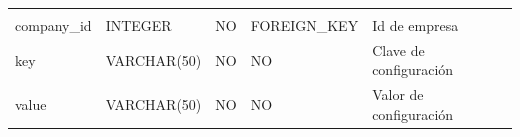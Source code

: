 \documentclass[12pt,a4paperpaper,]{report}
\begin{document}
\begin{longtable}[]{@{}lllll@{}}
\begin{minipage}[t]{0.11\columnwidth}
\end{minipage}\tabularnewline
\begin{minipage}[t]{0.21\columnwidth}\raggedright\strut
company\_id\strut
\end{minipage} & \begin{minipage}[t]{0.19\columnwidth}\raggedright\strut
INTEGER\strut
\end{minipage} & \begin{minipage}[t]{0.16\columnwidth}\raggedright\strut
NO\strut
\end{minipage} & \begin{minipage}[t]{0.19\columnwidth}\raggedright\strut
FOREIGN\_KEY\strut
\end{minipage} & \begin{minipage}[t]{0.11\columnwidth}\raggedright\strut
Id de empresa\strut
\end{minipage}\tabularnewline
\begin{minipage}[t]{0.21\columnwidth}\raggedright\strut
key\strut
\end{minipage} & \begin{minipage}[t]{0.19\columnwidth}\raggedright\strut
VARCHAR(50)\strut
\end{minipage} & \begin{minipage}[t]{0.16\columnwidth}\raggedright\strut
NO\strut
\end{minipage} & \begin{minipage}[t]{0.19\columnwidth}\raggedright\strut
NO\strut
\end{minipage} & \begin{minipage}[t]{0.11\columnwidth}\raggedright\strut
Clave de configuración\strut
\end{minipage}\tabularnewline
\begin{minipage}[t]{0.21\columnwidth}\raggedright\strut
value\strut
\end{minipage} & \begin{minipage}[t]{0.19\columnwidth}\raggedright\strut
VARCHAR(50)\strut
\end{minipage} & \begin{minipage}[t]{0.16\columnwidth}\raggedright\strut
NO\strut
\end{minipage} & \begin{minipage}[t]{0.19\columnwidth}\raggedright\strut
NO\strut
\end{minipage} & \begin{minipage}[t]{0.11\columnwidth}\raggedright\strut
Valor de configuración\strut
\end{minipage}\tabularnewline
\bottomrule
\end{longtable}
\end{document}

